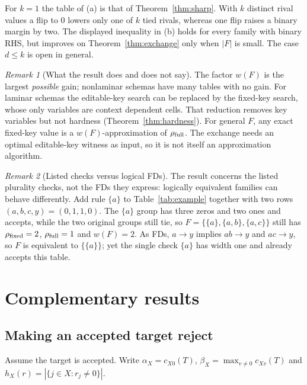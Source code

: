 \documentclass[11pt]{article}
\theoremstyle{remark}
\newtheorem{remark}{Remark}
\newcommand{\rfull}{\rho_{\rm full}}
\newcommand{\rfix}{\rho_{\rm fixed}}
\begin{document}
For $k=1$ the table of (a) is that of Theorem~\ref{thm:sharp}. With $k$
distinct rival values a flip to $0$ lowers only one of $k$ tied rivals, whereas
one flip raises a binary margin by two. The displayed inequality in (b) holds
for every family with binary RHS, but improves on Theorem~\ref{thm:exchange}
only when $|F|$ is small. The case $d\le k$ is open in general.

\begin{remark}[What the result does and does not say]
The factor $w(F)$ is the largest \emph{possible} gain; nonlaminar schemas have
many tables with no gain. For laminar schemas the editable-key search can be
replaced by the fixed-key search, whose only variables are context dependent
cells. That reduction removes key variables but not hardness
(Theorem~\ref{thm:hardness}). For general $F$, any exact fixed-key value is a
$w(F)$-approximation of $\rfull$. The exchange needs an optimal editable-key
witness as input, so it is not itself an approximation algorithm.
\end{remark}

\begin{remark}[Listed checks versus logical FDs]
The result concerns the listed plurality checks, not the FDs they express:
logically equivalent families can behave differently. Add rule $\{a\}$ to
Table~\ref{tab:example} together with two rows $(a,b,c,y)=(0,1,1,0)$. The
$\{a\}$ group has three zeros and two ones and accepts, while the two original
groups still tie, so $F=\{\{a\},\{a,b\},\{a,c\}\}$ still has $\rfix=2$,
$\rfull=1$ and $w(F)=2$. As FDs, $a\to y$ implies $ab\to y$ and $ac\to y$, so
$F$ is equivalent to $\{\{a\}\}$; yet the single check $\{a\}$ has width one
and already accepts this table.
\end{remark}

\section{Complementary results}
\subsection{Making an accepted target reject}
Assume the target is accepted. Write $\alpha_X=c_{X0}(T)$,
$\beta_X=\max_{v\ne0}c_{Xv}(T)$ and $h_X(r)=|\{j\in X:r_j\ne0\}|$.
\end{document}
